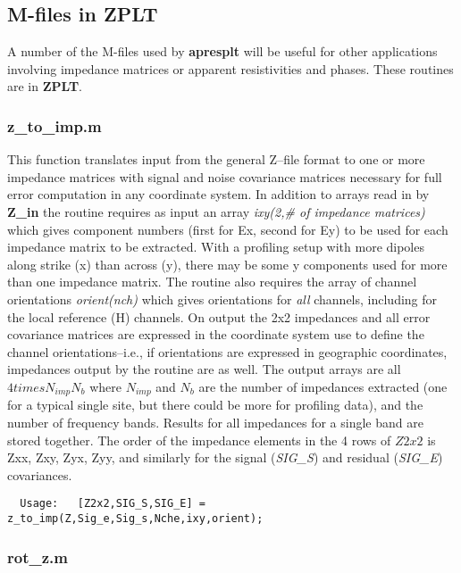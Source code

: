 \subsection{M-files in ZPLT}

A number of the M-files used by {\bf apresplt} will be useful
for other applications involving impedance matrices or apparent
resistivities and phases.  These routines are in {\bf ZPLT}.

\subsubsection{z\_to\_imp.m}

This function translates input from the general Z--file
format to one or more impedance matrices
with signal and noise covariance matrices necessary for full error
computation in any coordinate system.  In addition to arrays
read in by {\bf Z\_in} the routine requires as input an array 
{\it ixy(2,\# of impedance matrices)} which
gives component numbers (first for Ex, second for Ey)
to be used for each impedance matrix to be extracted.
With a profiling setup with more dipoles along strike (x) than
across (y), there may be some y components used for more than one
impedance matrix.  The routine also requires the array of channel
orientations {\it orient(nch)} which gives orientations for {\it all}
channels, including for the local reference (H) channels.
On output the 2x2 impedances and all error covariance matrices are
expressed in the coordinate system use
to define the channel orientations--i.e., if orientations are
expressed in geographic coordinates, impedances output by the routine
are as well.  The output arrays are all $ 4 times N_{imp} N_{b}$
where $N_{imp}$ and $N_{b}$ are the number of impedances extracted
(one for a typical single site, but there could be more for
profiling data), and the number of frequency bands.  Results for all
impedances for a single band are stored together.  
The order of the impedance elements in the 4 rows of
$Z2x2$ is Zxx, Zxy, Zyx, Zyy, and similarly for the signal ({\it SIG\_S})
and residual ({\it SIG\_E}) covariances.

\small
\begin{verbatim}
  Usage:   [Z2x2,SIG_S,SIG_E] = z_to_imp(Z,Sig_e,Sig_s,Nche,ixy,orient);
\end{verbatim}
\normalsize

\subsubsection{rot\_z.m}

